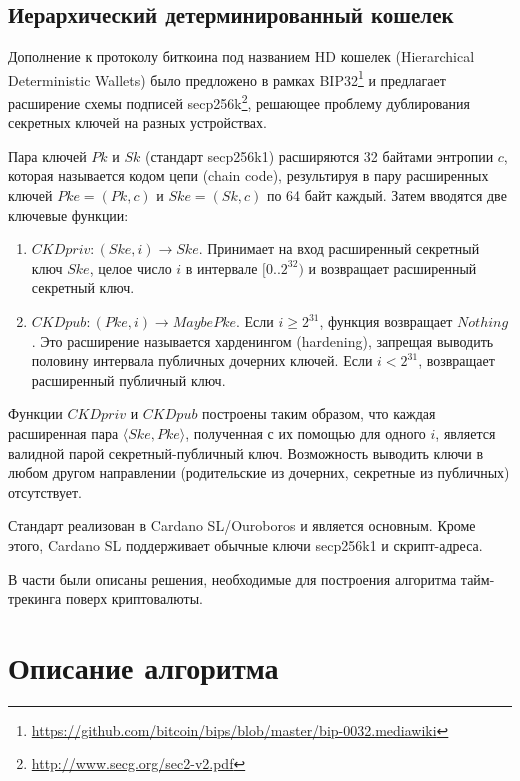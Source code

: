 \documentclass[]{itmo-student-thesis}
\begin{document}
\section{Иерархический детерминированный кошелек}

Дополнение к протоколу биткоина под названием HD кошелек (Hierarchical
Deterministic Wallets) было предложено в рамках
BIP32\footnote{\url{https://github.com/bitcoin/bips/blob/master/bip-0032.mediawiki}}
и предлагает расширение схемы подписей
secp256k\footnote{\url{http://www.secg.org/sec2-v2.pdf}}, решающее
проблему дублирования секретных ключей на разных устройствах.

Пара ключей $Pk$ и $Sk$ (стандарт secp256k1) расширяются 32 байтами
энтропии $c$, которая называется кодом цепи (chain code), результируя
в пару расширенных ключей $Pke = (Pk, c)$ и $Ske = (Sk, c)$ по 64 байт
каждый. Затем вводятся две ключевые функции:

\begin{enumerate}
\item $CKDpriv : (Ske, i) \rightarrow Ske$. Принимает на вход расширенный
  секретный ключ $Ske$, целое число $i$ в интервале $[0..2^{32})$ и
  возвращает расширенный секретный ключ.
\item $CKDpub : (Pke, i) \rightarrow Maybe Pke$. Если $i \geq 2^{31}$, функция
  возвращает $Nothing$. Это расширение называется харденингом
  (hardening), запрещая выводить половину интервала публичных дочерних
  ключей. Если $i < 2^{31}$, возвращает расширенный публичный ключ.
\end{enumerate}

Функции $CKDpriv$ и $CKDpub$ построены таким образом, что каждая
расширенная пара $\langle Ske,Pke \rangle$, полученная с их помощью для
одного $i$, является валидной парой секретный-публичный
ключ. Возможность выводить ключи в любом другом направлении
(родительские из дочерних, секретные из публичных) отсутствует.

Стандарт реализован в Cardano SL/Ouroboros и является основным. Кроме
этого, Cardano SL поддерживает обычные ключи secp256k1 и
скрипт-адреса.

\chapterconclusion

В части были описаны решения, необходимые для построения алгоритма
тайм-трекинга поверх криптовалюты.

\chapter{Описание алгоритма}
\end{document}
